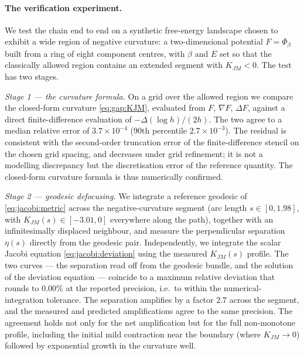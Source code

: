 \paragraph{The verification experiment.}
We test the chain end to end on a synthetic free-energy landscape chosen
to exhibit a wide region of negative curvature: a two-dimensional
potential $F=\Phi_\beta$ built from a ring of eight component centres,
with $\beta$ and $E$ set so that the classically allowed region contains
an extended segment with $K_{JM}<0$. The test has two stages.

\emph{Stage 1 --- the curvature formula.} On a grid over the allowed
region we compare the closed-form curvature \eqref{eq:gap:KJM}, evaluated
from $F$, $\nabla F$, $\Delta F$, against a direct finite-difference
evaluation of $-\Delta(\log h)/(2h)$. The two agree to a median relative
error of $3.7\times10^{-4}$ (90th percentile $2.7\times10^{-3}$). The
residual is consistent with the second-order truncation error of the
finite-difference stencil on the chosen grid spacing, and decreases under
grid refinement; it is not a modelling discrepancy but the discretisation
error of the reference quantity. The closed-form curvature formula is thus
numerically confirmed.

\emph{Stage 2 --- geodesic defocusing.} We integrate a reference geodesic
of \eqref{eq:jacobi:metric} across the negative-curvature segment (arc
length $s\in[0,1.98]$, with $K_{JM}(s)\in[-3.01,0]$ everywhere along the
path), together with an infinitesimally displaced neighbour, and measure
the perpendicular separation $\eta(s)$ directly from the geodesic pair.
Independently, we integrate the scalar Jacobi equation
\eqref{eq:jacobi:deviation} using the measured $K_{JM}(s)$ profile. The
two curves --- the separation read off from the geodesic bundle, and the
solution of the deviation equation --- coincide to a maximum relative
deviation that rounds to $0.00\%$ at the reported precision, i.e.\ to
within the numerical-integration tolerance. The separation amplifies by a
factor $2.7$ across the segment, and the measured and predicted
amplifications agree to the same precision. The agreement holds not only
for the net amplification but for the full non-monotone profile,
including the initial mild contraction near the boundary (where
$K_{JM}\to0$) followed by exponential growth in the curvature well.

